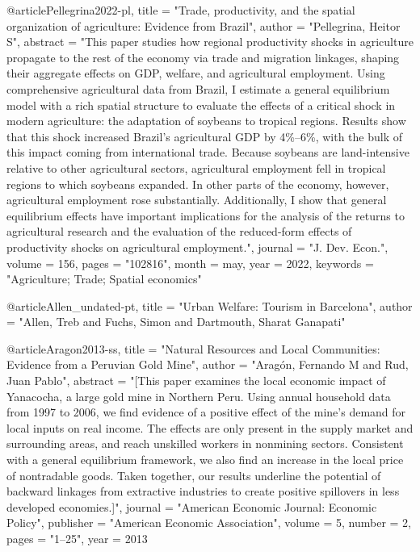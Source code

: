 {@article{Pellegrina2022-pl,
	title    = "Trade, productivity, and the spatial organization of agriculture:
	Evidence from Brazil",
	author   = "Pellegrina, Heitor S",
	abstract = "This paper studies how regional productivity shocks in
	agriculture propagate to the rest of the economy via trade and
	migration linkages, shaping their aggregate effects on GDP,
	welfare, and agricultural employment. Using comprehensive
	agricultural data from Brazil, I estimate a general equilibrium
	model with a rich spatial structure to evaluate the effects of a
	critical shock in modern agriculture: the adaptation of soybeans
	to tropical regions. Results show that this shock increased
	Brazil's agricultural GDP by 4\%--6\%, with the bulk of this
	impact coming from international trade. Because soybeans are
	land-intensive relative to other agricultural sectors,
	agricultural employment fell in tropical regions to which
	soybeans expanded. In other parts of the economy, however,
	agricultural employment rose substantially. Additionally, I show
	that general equilibrium effects have important implications for
	the analysis of the returns to agricultural research and the
	evaluation of the reduced-form effects of productivity shocks on
	agricultural employment.",
	journal  = "J. Dev. Econ.",
	volume   =  156,
	pages    = "102816",
	month    =  may,
	year     =  2022,
	keywords = "Agriculture; Trade; Spatial economics"
}

@article{Allen_undated-pt,
	title  = "Urban Welfare: Tourism in Barcelona",
	author = "Allen, Treb and Fuchs, Simon and Dartmouth, Sharat Ganapati"
}

@article{Aragon2013-ss,
	title     = "Natural Resources and Local Communities: Evidence from a
	Peruvian Gold Mine",
	author    = "Arag{\'o}n, Fernando M and Rud, Juan Pablo",
	abstract  = "[This paper examines the local economic impact of Yanacocha, a
	large gold mine in Northern Peru. Using annual household data
	from 1997 to 2006, we find evidence of a positive effect of the
	mine's demand for local inputs on real income. The effects are
	only present in the supply market and surrounding areas, and
	reach unskilled workers in nonmining sectors. Consistent with a
	general equilibrium framework, we also find an increase in the
	local price of nontradable goods. Taken together, our results
	underline the potential of backward linkages from extractive
	industries to create positive spillovers in less developed
	economies.]",
	journal   = "American Economic Journal: Economic Policy",
	publisher = "American Economic Association",
	volume    =  5,
	number    =  2,
	pages     = "1--25",
	year      =  2013
}

}
